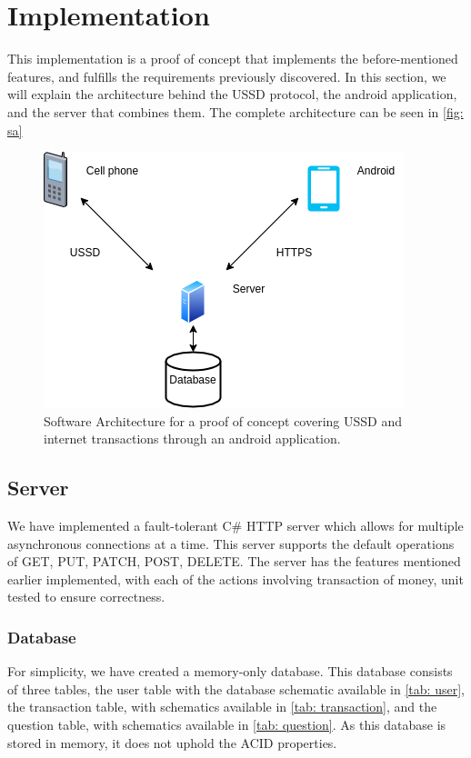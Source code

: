 \documentclass[11pt, a4paper]{article}
\begin{document}

\section{Implementation}
This implementation is a proof of concept that implements the before-mentioned features, and fulfills the requirements previously discovered. In this section, we will explain the architecture behind the USSD protocol, the android application, and the server that combines them. The complete architecture can be seen in \autoref{fig: sa}

\begin{figure}[ht]
\centering
\includegraphics[width=0.7\linewidth]{figs/SA2.png}
\caption{Software Architecture for a proof of concept covering USSD and internet transactions through an android application.}
\label{fig: sa}
\end{figure}
\subsection{Server} %
We have implemented a fault-tolerant C\# HTTP server which allows for multiple asynchronous connections at a time. This server supports the default operations of GET, PUT, PATCH, POST, DELETE. The server has the features mentioned earlier implemented, with each of the actions involving transaction of money, unit tested to ensure correctness.

\subsubsection{Database}{}
For simplicity, we have created a memory-only database. This database consists of three tables, the user table with the database schematic available in \autoref{tab: user}, the transaction table, with schematics available in \autoref{tab: transaction}, and the question table, with schematics available in \autoref{tab: question}. As this database is stored in memory, it does not uphold the ACID properties.
\end{document}
